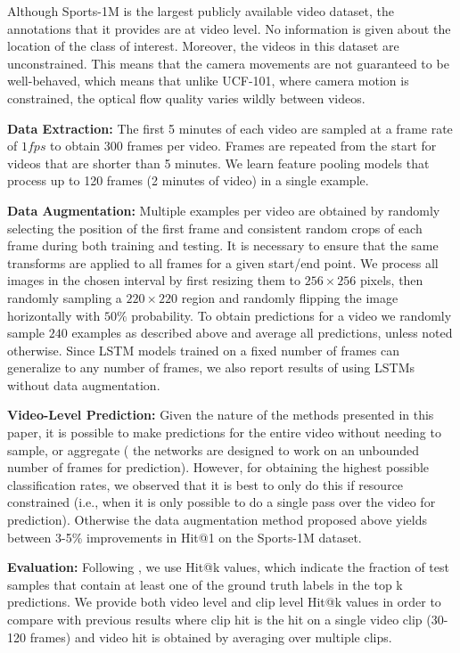 \documentclass[10pt,twocolumn,letterpaper]{article}
\begin{document}
Although Sports-1M is the largest publicly available video dataset,
the annotations that it provides are at video level. No information is
given about the location of the class of interest. Moreover, the videos
in this dataset are unconstrained. This means that the camera movements
are not guaranteed to be well-behaved, which means that unlike UCF-101,
where camera motion is constrained, the optical flow quality varies
wildly between videos.

\textbf{Data Extraction:} The first 5 minutes of each video are sampled
at a frame rate of $1 fps$ to obtain 300 frames per video.
Frames are repeated from the start for videos that are shorter than 5 minutes.
We learn feature pooling models that process up to 120 frames (2 minutes of
video) in a single example.

\textbf{Data Augmentation:} Multiple examples per video are obtained by
randomly selecting the position of the first frame and consistent random crops of each
frame during both training and testing. It is necessary to ensure that the same transforms
are applied to all frames for a given start/end point. We process all images in the
chosen interval by first resizing them to $256 \times 256$ pixels, then randomly
sampling a $220 \times 220$ region and randomly flipping the image horizontally
with $50\%$ probability. To obtain predictions for a video we randomly sample
$240$ examples as described above and average all predictions, unless noted otherwise.
Since LSTM models trained on a fixed number of frames can generalize to any number of frames,
we also report results of using LSTMs without data augmentation.

\textbf{Video-Level Prediction:} Given the nature of the methods presented in this paper,
it is possible to make predictions for the entire video without needing to sample, or aggregate (
the networks are designed to work on an unbounded number of frames for prediction). However,
for obtaining the highest possible classification rates, we observed that it is best to only
do this if resource constrained (i.e., when it is only possible to do a single pass over the
video for prediction). Otherwise the data augmentation method proposed above yields between 3-5\%
improvements in Hit@1 on the Sports-1M dataset.

\textbf{Evaluation:} Following \cite{karpathy2014large}, we use Hit@k values, which indicate the fraction of test
 samples that contain at least one of the ground truth labels in the top k predictions. We provide both video level
and clip level Hit@k values in order to compare with previous results where clip hit is the hit on a single video clip
 (30-120 frames) and video hit is obtained by averaging over multiple clips.
\end{document}
